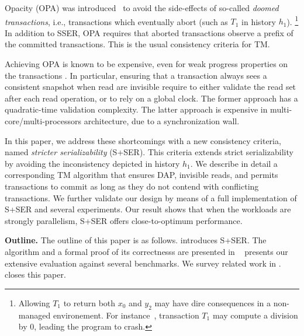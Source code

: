 Opacity (OPA) was introduced~\cite{guerraoui2008correctness} to avoid the side-effects of so-called \emph{doomed transactions}, i.e., transactions which eventually abort (such as $T_1$ in history $h_1$).%
\footnote{  
  Allowing $T_1$ to return both $x_0$ and $y_2$ may have dire consequences in a non-managed environement.
  For instance~\cite{guerraoui2008correctness}, transaction $T_1$ may compute a division by $0$, leading the program to crash.
}
In addition to SSER, OPA requires that aborted transactions observe a prefix of the committed transactions.
This is the usual consistency criteria for TM.

Achieving OPA is known to be expensive, even for weak progress properties on the transactions \cite{}.
In particular, ensuring that a transaction always sees a consistent snapshot when read are invisible require to either validate the read set after each read operation, or to rely on a global clock.
The former approach has a quadratic-time validation complexity.
The latter approach is expensive in multi-core/multi-processors architecture, due to a synchronization wall.

In this paper, we address these shortcomings with a new consistency criteria, named \emph{stricter serializability} (\textsc{S+SER}).
This criteria extends strict serializability by avoiding the inconsistency depicted in history $h_1$.
We describe in detail a corresponding TM algorithm that ensures DAP, invisible reads, and permits transactions to commit as long as they do not contend with conflicting transactions.
We further validate our design by means of a full implementation of \textsc{S+SER} and several experiments.
Our result shows that when the workloads are strongly parallelism, \textsc{S+SER} offers close-to-optimum performance.

\textbf{Outline.}
The outline of this paper is as follows.
 introduces S+SER.
The algorithm and a formal proof of its correctnesss are presented in ~
 presents our extensive evaluation against several benchmarks.
We survey related work in .
 closes this paper.
